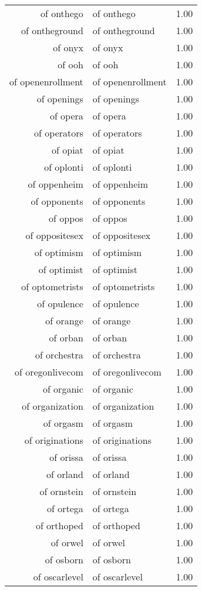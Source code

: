 \begin{table}[ht]
\begin{tabular}{rlr}
  of onthego & of onthego & 1.00 \\ 
  of ontheground & of ontheground & 1.00 \\ 
  of onyx & of onyx & 1.00 \\ 
  of ooh & of ooh & 1.00 \\ 
  of openenrollment & of openenrollment & 1.00 \\ 
  of openings & of openings & 1.00 \\ 
  of opera & of opera & 1.00 \\ 
  of operators & of operators & 1.00 \\ 
  of opiat & of opiat & 1.00 \\ 
  of oplonti & of oplonti & 1.00 \\ 
  of oppenheim & of oppenheim & 1.00 \\ 
  of opponents & of opponents & 1.00 \\ 
  of oppos & of oppos & 1.00 \\ 
  of oppositesex & of oppositesex & 1.00 \\ 
  of optimism & of optimism & 1.00 \\ 
  of optimist & of optimist & 1.00 \\ 
  of optometrists & of optometrists & 1.00 \\ 
  of opulence & of opulence & 1.00 \\ 
  of orange & of orange & 1.00 \\ 
  of orban & of orban & 1.00 \\ 
  of orchestra & of orchestra & 1.00 \\ 
  of oregonlivecom & of oregonlivecom & 1.00 \\ 
  of organic & of organic & 1.00 \\ 
  of organization & of organization & 1.00 \\ 
  of orgasm & of orgasm & 1.00 \\ 
  of originations & of originations & 1.00 \\ 
  of orissa & of orissa & 1.00 \\ 
  of orland & of orland & 1.00 \\ 
  of ornstein & of ornstein & 1.00 \\ 
  of ortega & of ortega & 1.00 \\ 
  of orthoped & of orthoped & 1.00 \\ 
  of orwel & of orwel & 1.00 \\ 
  of osborn & of osborn & 1.00 \\ 
  of oscarlevel & of oscarlevel & 1.00 \\ 

\end{tabular}
\end{table}
